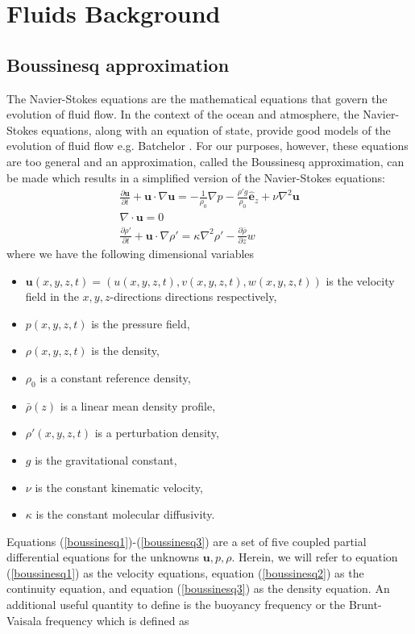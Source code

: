 \chapter{Fluids Background}
\section{Boussinesq approximation}

The Navier-Stokes equations are the mathematical equations that govern the evolution of fluid flow. In the context of the ocean and atmosphere, the Navier-Stokes equations, along with an equation of state, provide good models of the evolution of fluid flow e.g. Batchelor \cite{batchelor}. For our purposes, however, these equations are too general and an approximation, called the Boussinesq approximation, can be made which results in a simplified version of the Navier-Stokes equations:  
\begin{align} 
\frac{\partial \bm{u}}{\partial t} + \bm{u}\cdot \nabla \bm{u} = -\frac{1}{\rho_{0}}\nabla p - \frac{\rho' g}{\rho_{0}}\hat{\bm{e}}_{z} + \nu \nabla^{2}\bm{u} \label{boussinesq1}\\
\nabla \cdot \bm{u} =0 \label{boussinesq2}\\
\frac{\partial \rho'}{\partial t} + \bm{u}\cdot \nabla \rho' = \kappa \nabla^{2}\rho' - \frac{\partial \bar{\rho}}{\partial z} w\label{boussinesq3}
\end{align}
where we have the following dimensional variables
\begin{itemize}
\item $\textbf{u}(x,y,z,t)=(u(x,y,z,t),v(x,y,z,t),w(x,y,z,t))$ is the velocity field in the $x,y,z$-directions directions respectively,
\item $p(x,y,z,t)$ is the pressure field,
\item $\rho(x,y,z,t)$ is the density,
\item $\rho_{0}$ is a constant reference density,
\item $\bar{\rho}(z)$ is a linear mean density profile,
\item $\rho'(x,y,z,t)$ is a perturbation density,
\item $g$ is the gravitational constant,
\item $\nu$ is the constant kinematic velocity,
\item $\kappa$ is the constant molecular diffusivity.
\end{itemize}
Equations (\ref{boussinesq1})-(\ref{boussinesq3}) are a set of five coupled partial differential equations for the unknowns $\textbf{u},p,\rho$. Herein, we will refer to equation (\ref{boussinesq1}) as the velocity equations, equation (\ref{boussinesq2}) as the continuity equation, and equation (\ref{boussinesq3}) as the density equation. An additional useful quantity to define is the buoyancy frequency or the Brunt-Vaisala frequency which is defined as
